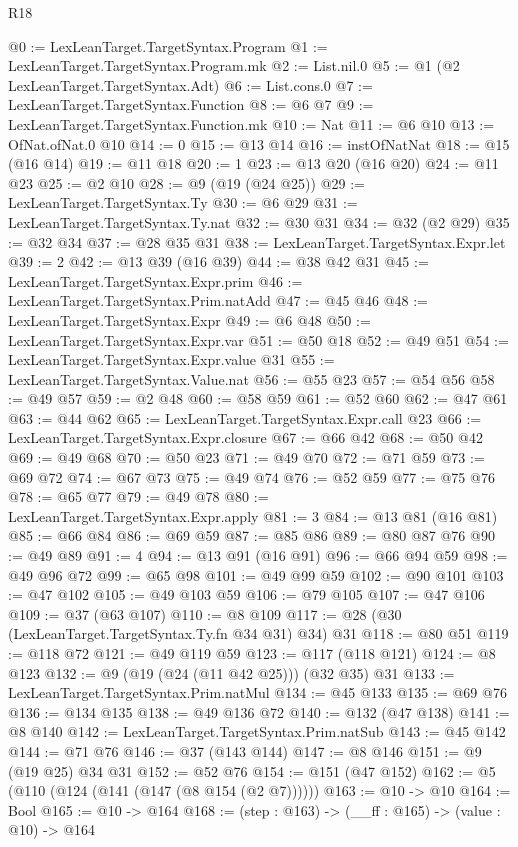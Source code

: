 \begin{lexlean}{R18}
\begin{coremodule}
{{{{{{{{{{{{{@0 := LexLeanTarget.TargetSyntax.Program
@1 := LexLeanTarget.TargetSyntax.Program.mk
@2 := List.nil.{0}
@5 := @1 (@2 LexLeanTarget.TargetSyntax.Adt)
@6 := List.cons.{0}
@7 := LexLeanTarget.TargetSyntax.Function
@8 := @6 @7
@9 := LexLeanTarget.TargetSyntax.Function.mk
@10 := Nat
@11 := @6 @10
@13 := OfNat.ofNat.{0} @10
@14 := 0
@15 := @13 @14
@16 := instOfNatNat
@18 := @15 (@16 @14)
@19 := @11 @18
@20 := 1
@23 := @13 @20 (@16 @20)
@24 := @11 @23
@25 := @2 @10
@28 := @9 (@19 (@24 @25))
@29 := LexLeanTarget.TargetSyntax.Ty
@30 := @6 @29
@31 := LexLeanTarget.TargetSyntax.Ty.nat
@32 := @30 @31
@34 := @32 (@2 @29)
@35 := @32 @34
@37 := @28 @35 @31
@38 := LexLeanTarget.TargetSyntax.Expr.let
@39 := 2
@42 := @13 @39 (@16 @39)
@44 := @38 @42 @31
@45 := LexLeanTarget.TargetSyntax.Expr.prim
@46 := LexLeanTarget.TargetSyntax.Prim.natAdd
@47 := @45 @46
@48 := LexLeanTarget.TargetSyntax.Expr
@49 := @6 @48
@50 := LexLeanTarget.TargetSyntax.Expr.var
@51 := @50 @18
@52 := @49 @51
@54 := LexLeanTarget.TargetSyntax.Expr.value @31
@55 := LexLeanTarget.TargetSyntax.Value.nat
@56 := @55 @23
@57 := @54 @56
@58 := @49 @57
@59 := @2 @48
@60 := @58 @59
@61 := @52 @60
@62 := @47 @61
@63 := @44 @62
@65 := LexLeanTarget.TargetSyntax.Expr.call @23
@66 := LexLeanTarget.TargetSyntax.Expr.closure
@67 := @66 @42
@68 := @50 @42
@69 := @49 @68
@70 := @50 @23
@71 := @49 @70
@72 := @71 @59
@73 := @69 @72
@74 := @67 @73
@75 := @49 @74
@76 := @52 @59
@77 := @75 @76
@78 := @65 @77
@79 := @49 @78
@80 := LexLeanTarget.TargetSyntax.Expr.apply
@81 := 3
@84 := @13 @81 (@16 @81)
@85 := @66 @84
@86 := @69 @59
@87 := @85 @86
@89 := @80 @87 @76
@90 := @49 @89
@91 := 4
@94 := @13 @91 (@16 @91)
@96 := @66 @94 @59
@98 := @49 @96 @72
@99 := @65 @98
@101 := @49 @99 @59
@102 := @90 @101
@103 := @47 @102
@105 := @49 @103 @59
@106 := @79 @105
@107 := @47 @106
@109 := @37 (@63 @107)
@110 := @8 @109
@117 := @28 (@30 (LexLeanTarget.TargetSyntax.Ty.fn @34 @31) @34) @31
@118 := @80 @51
@119 := @118 @72
@121 := @49 @119 @59
@123 := @117 (@118 @121)
@124 := @8 @123
@132 := @9 (@19 (@24 (@11 @42 @25))) (@32 @35) @31
@133 := LexLeanTarget.TargetSyntax.Prim.natMul
@134 := @45 @133
@135 := @69 @76
@136 := @134 @135
@138 := @49 @136 @72
@140 := @132 (@47 @138)
@141 := @8 @140
@142 := LexLeanTarget.TargetSyntax.Prim.natSub
@143 := @45 @142
@144 := @71 @76
@146 := @37 (@143 @144)
@147 := @8 @146
@151 := @9 (@19 @25) @34 @31
@152 := @52 @76
@154 := @151 (@47 @152)
@162 := @5 (@110 (@124 (@141 (@147 (@8 @154 (@2 @7))))))
@163 := @10 -> @10
@164 := Bool
@165 := @10 -> @164
@168 := (step : @163) -> (__ff : @165) -> (value : @10) -> @164
}}}}}}}}}}}}}
\end{coremodule}
\end{lexlean}
